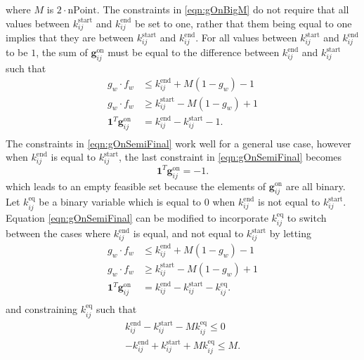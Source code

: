 where $M$ is $2\cdot\text{nPoint}$. The constraints in \eqref{eqn:gOnBigM} do not require that all values between $k_{ij}^{\text{start}}$ and $k_{ij}^{\text{end}}$ be set to one, rather that them being equal to one implies that they are between  $k_{ij}^{\text{start}}$ and $k_{ij}^{\text{end}}$. For all values between  $k_{ij}^{\text{start}}$ and $k_{ij}^{\text{end}}$ to be $1$, the sum of $\mathbf{g}_{ij}^{\text{on}}$ must be equal to the difference between $k_{ij}^{\text{end}}$ and $k_{ij}^{\text{start}}$ such that 
\begin{equation} \label{eqn:gOnSemiFinal}\begin{aligned}
	g_w\cdot f_w &\le k^{\text{end}}_{ij} + M(1 - g_w) - 1 \\
	g_w\cdot f_w &\ge k^{\text{start}}_{ij} - M(1 - g_w) + 1 \\ 
	\mathbf{1}^T\mathbf{g}_{ij}^{\text{on}} &= k_{ij}^{\text{end}} - k_{ij}^{\text{start}} - 1.\\
\end{aligned} \end{equation}
The constraints in \eqref{eqn:gOnSemiFinal} work well for a general use case, however when $k_{ij}^{\text{end}}$ is equal to $k_{ij}^{\text{start}}$, the last constraint in \eqref{eqn:gOnSemiFinal} becomes
\begin{equation}
	\mathbf{1}^T\mathbf{g}_{ij}^{\text{on}} = -1.
\end{equation}
which leads to an empty feasible set because the elements of $\mathbf{g}_{ij}^{\text{on}}$ are all binary. Let $k_{ij}^{\text{eq}}$ be a binary variable which is equal to $0$ when $k_{ij}^{\text{end}}$ is not equal to $k_{ij}^{\text{start}}$. Equation \eqref{eqn:gOnSemiFinal} can be modified to incorporate $k_{ij}^{\text{eq}}$ to switch between the cases where $k_{ij}^{\text{end}}$ is equal, and not equal to $k_{ij}^{\text{start}}$ by letting 
\begin{equation} \label{eqn:gOnFinal}\begin{aligned}
	g_w\cdot f_w &\le k^{\text{end}}_{ij} + M(1 - g_w) - 1 \\
	g_w\cdot f_w &\ge k^{\text{start}}_{ij} - M(1 - g_w) + 1 \\ 
	\mathbf{1}^T\mathbf{g}_{ij}^{\text{on}} &= k_{ij}^{\text{end}} - k_{ij}^{\text{start}} - k_{ij}^{\text{eq}}.\\
\end{aligned} \end{equation} 
 and constraining $k_{ij}^{\text{eq}}$ such that 
\begin{equation}\label{eqn:kEq}\begin{aligned}
	k_{ij}^{\text{end}} - k_{ij}^{\text{start}} - M k_{ij}^{\text{eq}} \le 0 \\
	-k_{ij}^{\text{end}} + k_{ij}^{\text{start}} + M k_{ij}^{\text{eq}} \le M .
\end{aligned}\end{equation}
